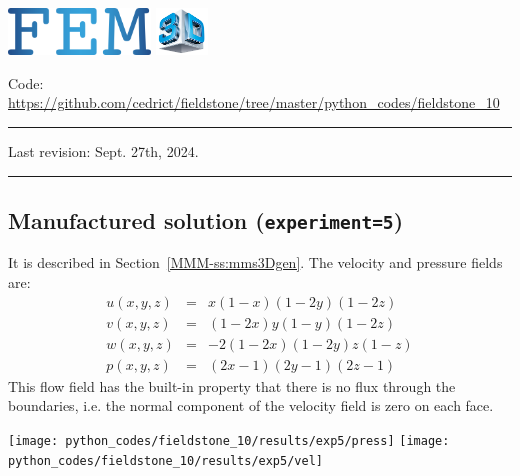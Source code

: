 \includegraphics[height=1.25cm]{images/pictograms/FEM}
\includegraphics[height=1.25cm]{images/pictograms/3d}




\begin{center}
\inpython
\injulia
\infortran
{\small Code: \url{https://github.com/cedrict/fieldstone/tree/master/python_codes/fieldstone_10}}
\end{center}

\par\noindent\rule{\textwidth}{0.4pt}

Last revision: Sept. 27th, 2024.

\par\noindent\rule{\textwidth}{0.4pt}


\subsection*{Manufactured solution ({\tt experiment=5})}

It is described in Section~\ref{MMM-ss:mms3Dgen}.
The velocity and pressure fields are:
\begin{eqnarray}
u(x,y,z) &=& x(1-x)(1-2y)(1-2z)\\
v(x,y,z) &=& (1-2x) y(1-y) (1-2z) \\
w(x,y,z) &=& -2(1-2x)(1-2y)z(1-z) \\
p(x,y,z) &=& (2x-1)(2y-1)(2z-1)
\end{eqnarray}
This flow field has the built-in property that there is no flux through the 
boundaries, i.e. the normal component of the velocity field is zero on each face. 

\begin{center}
\texttt{[image: python\_codes/fieldstone\_10/results/exp5/press]}
\texttt{[image: python\_codes/fieldstone\_10/results/exp5/vel]}
\end{center}

